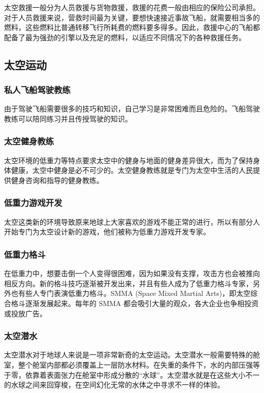 \documentclass[letterpaper,10pt]{sphinxmanual}
\begin{document}
太空救援一般分为人员救援与货物救援，救援的花费一般由相应的保险公司承担。对于人员救援来说，营救时间最为关键，要想快速接近事故飞船，就需要相当多的燃料，这些燃料比普通转移飞行所耗费的燃料要多得多。因此，救援中心的飞船都配备了最为强劲的引擎以及充足的燃料，以适应不同情况下的各种救援任务。


\subsection{太空运动}
\label{profession:id10}

\subsubsection{私人飞船驾驶教练}
\label{profession:id11}
由于驾驶飞船需要很多的技巧和知识，自己学习是非常困难而且危险的。飞船驾驶教练可以陪同练习并且传授驾驶的知识。


\subsubsection{太空健身教练}
\label{profession:id12}
太空环境的低重力等特点要求太空中的健身与地面的健身差异很大，而为了保持身体健康，太空中健身是必不可少的。太空健身教练就是专门为太空中生活的人民提供健身咨询和指导的健身教练。


\subsubsection{低重力游戏开发}
\label{profession:id13}
太空这类新的环境导致原来地球上大家喜欢的游戏不能正常的进行，所以有部分人开始专门为太空设计新的游戏，他们被称为低重力游戏开发专家。


\subsubsection{低重力格斗}
\label{profession:id14}
在低重力中，想要击倒一个人变得很困难，因为如果没有支撑，攻击方也会被推向相反方向。新的格斗技巧逐渐被开发出来，并且有些人成为了低重力格斗专家，另外也有些人专门表演低重力格斗。SMMA (Space Mixed Martial Arts)，即太空综合格斗逐渐发展起来。每年的 SMMA 都会吸引大量的观众，各大企业也争相投资或投放广告。


\subsubsection{太空潜水}
\label{profession:id15}
太空潜水对于地球人来说是一项非常新奇的太空运动。太空潜水一般需要特殊的舱室，整个舱室内部都必须覆盖上一层防水材料。在失重的条件下，水的内部压强等于零，依靠着表面张力在舱室中形成分散的“水球”。太空潜水就是在这些大小不一的水球之间来回穿梭，在空间幻化无常的水体之中寻求不一样的体验。
\end{document}

